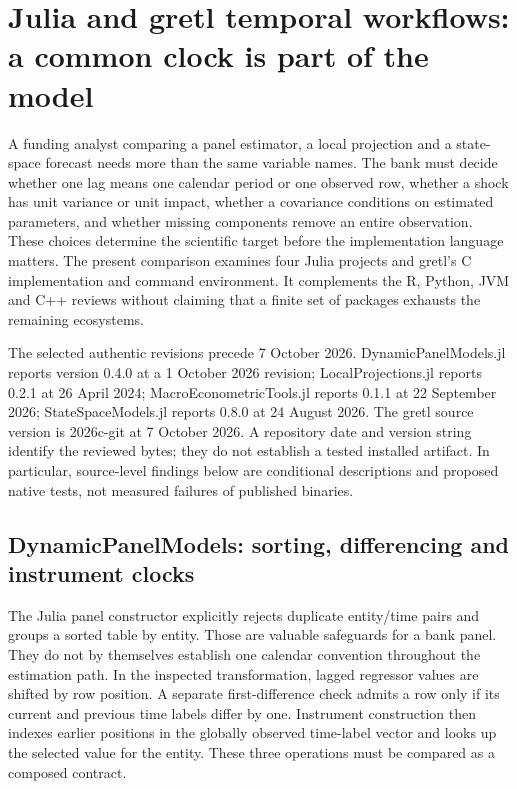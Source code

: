 \section{Julia and gretl temporal workflows: a common clock is part of the model}
\label{sec:exec25-other-dynamic}

A funding analyst comparing a panel estimator, a local projection and a state-space forecast needs more than the same variable names. The bank must decide whether one lag means one calendar period or one observed row, whether a shock has unit variance or unit impact, whether a covariance conditions on estimated parameters, and whether missing components remove an entire observation. These choices determine the scientific target before the implementation language matters. The present comparison examines four Julia projects and gretl's C implementation and command environment. It complements the R, Python, JVM and C++ reviews without claiming that a finite set of packages exhausts the remaining ecosystems.

The selected authentic revisions precede 7 October 2026. DynamicPanelModels.jl reports version 0.4.0 at a 1 October 2026 revision; LocalProjections.jl reports 0.2.1 at 26 April 2024; MacroEconometricTools.jl reports 0.1.1 at 22 September 2026; StateSpaceModels.jl reports 0.8.0 at 24 August 2026. The gretl source version is 2026c-git at 7 October 2026. A repository date and version string identify the reviewed bytes; they do not establish a tested installed artifact. In particular, source-level findings below are conditional descriptions and proposed native tests, not measured failures of published binaries.~\citep{exec25_odyn_dpm,exec25_odyn_lp,exec25_odyn_macro,exec25_odyn_ssm,exec25_odyn_gretl}

\subsection{DynamicPanelModels: sorting, differencing and instrument clocks}

The Julia panel constructor explicitly rejects duplicate entity/time pairs and groups a sorted table by entity. Those are valuable safeguards for a bank panel. They do not by themselves establish one calendar convention throughout the estimation path. In the inspected transformation, lagged regressor values are shifted by row position. A separate first-difference check admits a row only if its current and previous time labels differ by one. Instrument construction then indexes earlier positions in the globally observed time-label vector and looks up the selected value for the entity. These three operations must be compared as a composed contract.~\citep{exec25_odyn_dpm}

